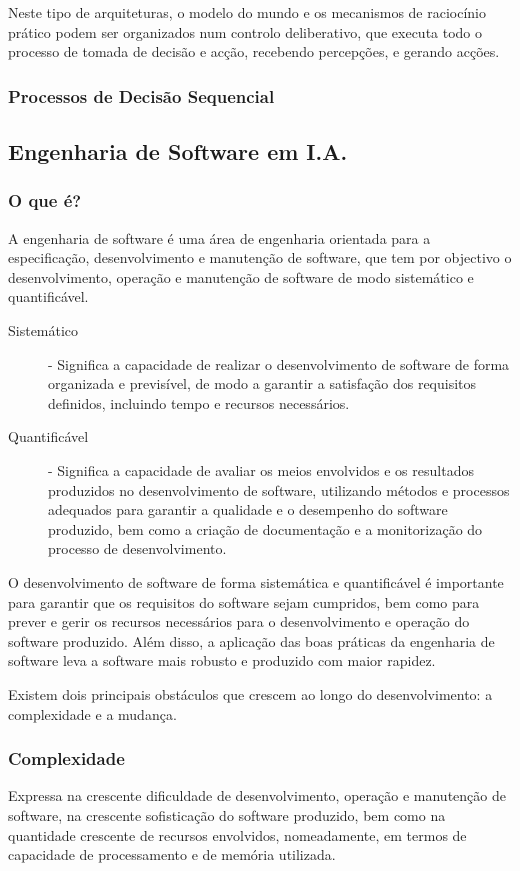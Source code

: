 \documentclass[a4paper,12pt]{article}
\begin{document}
Neste tipo de arquiteturas, o modelo do mundo e os mecanismos de raciocínio prático podem ser organizados num controlo deliberativo, que executa todo o processo de tomada de decisão e acção, recebendo percepções, e gerando acções.

\subsubsection{Processos de Decisão Sequencial}


\newpage
\subsection{Engenharia de Software em I.A.}
\subsubsection{O que é?}
A engenharia de software é uma área de engenharia orientada para a especificação, desenvolvimento e manutenção de software, que tem por objectivo o desenvolvimento, operação e manutenção de software de modo sistemático e quantificável.
\begin{description}
	\item[Sistemático] - Significa a capacidade de realizar o desenvolvimento de software de forma organizada e previsível, de modo a garantir a satisfação dos requisitos definidos, incluindo tempo e recursos necessários.
	\item[Quantificável] - Significa a capacidade de avaliar os meios envolvidos e os resultados produzidos no desenvolvimento de software, utilizando métodos e processos adequados para garantir a qualidade e o desempenho do software produzido, bem como a criação de documentação e a monitorização do processo de desenvolvimento.
\end{description}

O desenvolvimento de software de forma sistemática e quantificável é importante para garantir que os requisitos do software sejam cumpridos, bem como para prever e gerir os recursos necessários para o desenvolvimento e operação do software produzido.
Além disso, a aplicação das boas práticas da engenharia de software leva a software mais robusto e produzido com maior rapidez.

Existem dois principais obstáculos que crescem ao longo do desenvolvimento: a complexidade e a mudança.
\subsubsection{Complexidade}
Expressa na crescente dificuldade de desenvolvimento, operação e manutenção de software, na crescente sofisticação do software produzido, bem como na quantidade crescente de recursos envolvidos, nomeadamente, em termos de capacidade de processamento e de memória utilizada.
\end{document}
